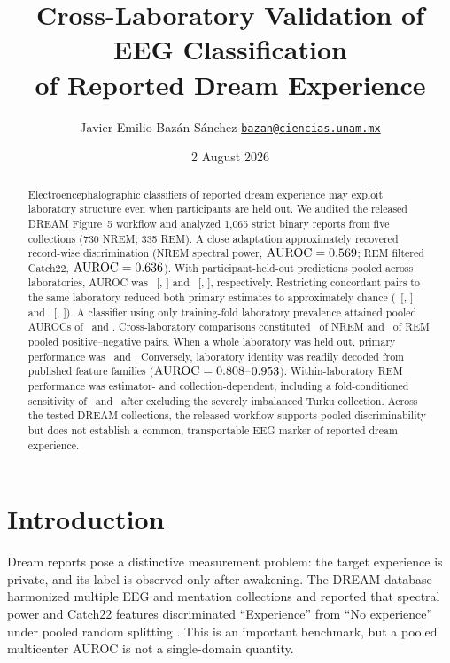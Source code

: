 \documentclass[10pt,twocolumn]{article}
\title{Cross-Laboratory Validation of EEG Classification\\
of Reported Dream Experience}
\author{Javier Emilio Baz\'an S\'anchez \quad
\normalsize\href{mailto:bazan@ciencias.unam.mx}{\texttt{bazan@ciencias.unam.mx}}}
\date{2 August 2026}
\newcommand{\AUC}{\mathrm{AUROC}}
\begin{document}
\maketitle

\begin{abstract}
Electroencephalographic classifiers of reported dream experience may exploit
laboratory structure even when participants are held out. We audited the
released DREAM Figure~5 workflow and analyzed 1,065 strict binary reports from
five collections (730 NREM; 335 REM). A close adaptation approximately
recovered record-wise discrimination (NREM spectral power,
$\AUC=\NremRandomAUC$; REM filtered Catch22, $\AUC=\RemRandomAUC$). With
participant-held-out predictions pooled across laboratories, AUROC was
\NremPooledAUC\ [\NremPooledLow, \NremPooledHigh] and
\RemPooledAUC\ [\RemPooledLow, \RemPooledHigh], respectively. Restricting
concordant pairs to the same laboratory reduced both primary estimates to
approximately chance (\NremWithinPairAUC\ [\NremWithinPairLow,
\NremWithinPairHigh] and \RemWithinPairAUC\ [\RemWithinPairLow,
\RemWithinPairHigh]). A classifier using only training-fold laboratory
prevalence attained pooled AUROCs of \NremSiteOnlyPooledAUC\ and
\RemSiteOnlyPooledAUC. Cross-laboratory comparisons constituted
\NremCrossPairFraction\ of NREM and \RemCrossPairFraction\ of REM pooled
positive--negative pairs. When a whole laboratory was held out, primary
performance was \NremLaboratoryAUC\ and \RemLaboratoryAUC. Conversely,
laboratory identity was readily decoded from published feature families
($\AUC=\PublishedIdentityMin$--$0.953$). Within-laboratory REM
performance was estimator- and collection-dependent, including a
fold-conditioned sensitivity of \RemFoldWithinPairAUC\ and
\RemNoTurkuFoldWithinPairAUC\ after excluding the severely imbalanced Turku
collection. Across the tested DREAM collections, the released workflow
supports pooled discriminability but does not establish a common,
transportable EEG marker of reported dream experience.
\end{abstract}

\section{Introduction}

Dream reports pose a distinctive measurement problem: the target experience
is private, and its label is observed only after awakening. The DREAM database
harmonized multiple EEG and mentation collections and reported that spectral
power and Catch22 features discriminated ``Experience'' from ``No experience''
under pooled random splitting \citep{wong2025dream,lubba2019catch22}. This is an
important benchmark, but a pooled multicenter AUROC is not a single-domain
quantity.
\end{document}
